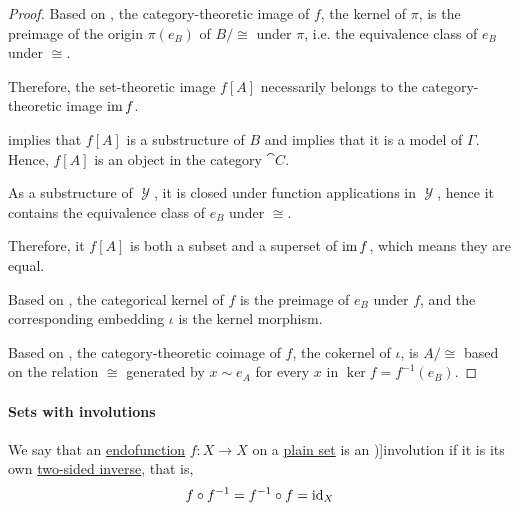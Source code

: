 \begin{proof}
  Based on , the category-theoretic image of \( f \), the kernel of \( \pi \), is the preimage of the origin \( \pi(e_B) \) of \( B / {\cong} \) under \( \pi \), i.e. the equivalence class of \( e_B \) under \( {\cong} \).

  Therefore, the set-theoretic image \( f[A] \) necessarily belongs to the category-theoretic image \( \operatorname{im} f \).

   implies that \( f[A] \) is a substructure of \( B \) and  implies that it is a model of \( \Gamma \). Hence, \( f[A] \) is an object in the category \( \cat{C} \).

  As a substructure of \( \mscrY \), it is closed under function applications in \( \mscrY \), hence it contains the equivalence class of \( e_B \) under \( {\cong} \).

  Therefore, it \( f[A] \) is both a subset and a superset of \( \operatorname{im} f \), which means they are equal.

   Based on , the categorical kernel of \( f \) is the preimage of \( e_B \) under \( f \), and the corresponding embedding \( \iota \) is the kernel morphism.

  Based on , the category-theoretic coimage of \( f \), the cokernel of \( \iota \), is \( A / {\cong} \) based on the relation \( {\cong} \) generated by \( x \sim e_A \) for every \( x \) in \( \ker f = f^{-1}(e_B) \).
\end{proof}

\paragraph{Sets with involutions}

\begin{definition}\label{def:involution}
  We say that an \hyperref[def:function/endofunction]{endofunction} \( f: X \to X \) on a \hyperref[def:set]{plain set} is an \term[ru=инволюция (\cite[333]{Арнольд2012})]{involution} if it is its own \hyperref[def:morphism_invertibility/isomorphism]{two-sided inverse}, that is,
  \begin{equation*}
    f \circ f^{-1} = f^{-1} \circ f = \operatorname{id}_X
  \end{equation*}
\end{definition}

